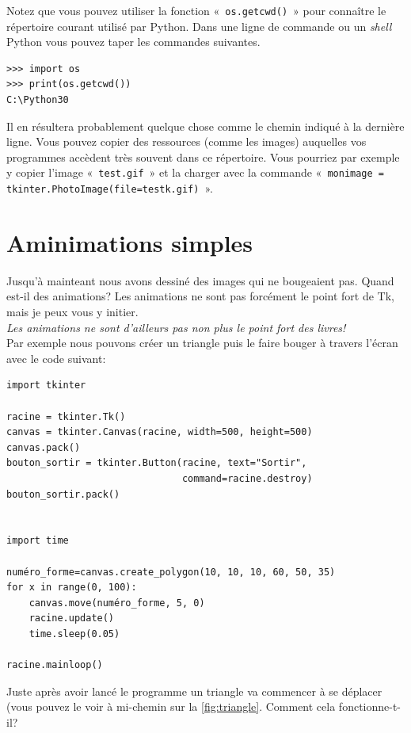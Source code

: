 Notez que vous pouvez utiliser la fonction «~\texttt{os.getcwd()}~» pour connaître le répertoire courant utilisé par Python. Dans une ligne de commande ou un \emph{shell} Python vous pouvez taper les commandes suivantes.
\begin{Verbatim}[frame=single,rulecolor=\color{mbleu}, label=à taper]
>>> import os 
>>> print(os.getcwd())
C:\Python30
\end{Verbatim}

Il en résultera probablement quelque chose comme le chemin indiqué à la dernière ligne. Vous pouvez copier des ressources (comme les images) auquelles vos programmes accèdent très souvent dans ce répertoire. Vous pourriez par exemple y copier l'image «~\texttt{test.gif}~» et la charger avec la commande «~\texttt{monimage = tkinter.PhotoImage(file=testk.gif)}~».

\section{Aminimations simples}
Jusqu'à mainteant nous avons dessiné des images qui ne bougeaient pas. Quand est-il des animations?
Les animations ne sont pas forcément le point fort de Tk, mais je peux vous y initier.\\

\emph{Les animations ne sont d'ailleurs pas non plus le point fort des livres!}\\

Par exemple nous pouvons créer un triangle puis le faire bouger à travers l'écran avec le code suivant:
\begin{Verbatim}[frame=single,rulecolor=\color{mbleu}, label=à taper]
import tkinter

racine = tkinter.Tk()
canvas = tkinter.Canvas(racine, width=500, height=500)
canvas.pack()
bouton_sortir = tkinter.Button(racine, text="Sortir",
                               command=racine.destroy)
bouton_sortir.pack()


import time

numéro_forme=canvas.create_polygon(10, 10, 10, 60, 50, 35)
for x in range(0, 100):
    canvas.move(numéro_forme, 5, 0)
    racine.update()
    time.sleep(0.05)

racine.mainloop()
\end{Verbatim}

Juste après avoir lancé le programme un triangle va commencer à se déplacer (vous pouvez le voir à mi-chemin sur la \autoref{fig:triangle}. Comment cela fonctionne-t-il?

